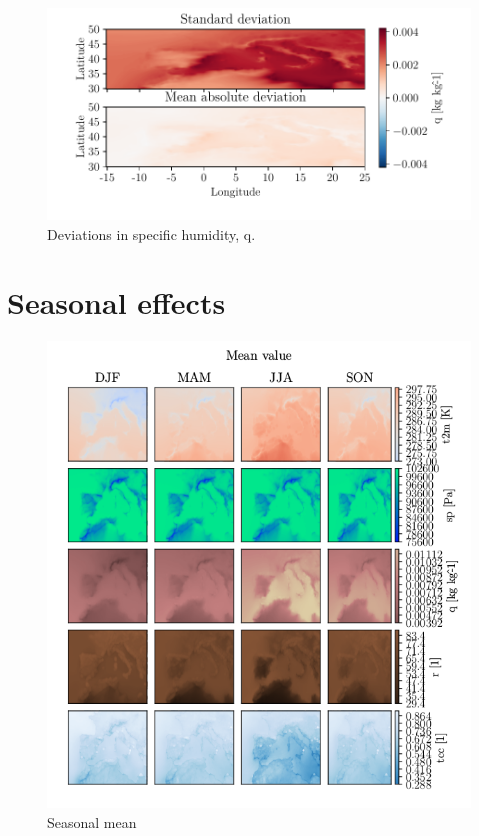 \begin{figure}[ht]
    \centering
    \includegraphics{python_figs/DEVIATION_all_stat_variable_q.pdf}
    \caption{Deviations in specific humidity, q.}
    \label{fig:deviation_q}
\end{figure}


\cleardoublepage
\chapter{Seasonal effects} \label{app:seasonal_plots}
\begin{figure}[ht]
    \centering
    \includegraphics{python_figs/seasonal_mean_all_variables.png}
    \caption{Seasonal mean}
    \label{fig:seasonal_mean}
\end{figure}

